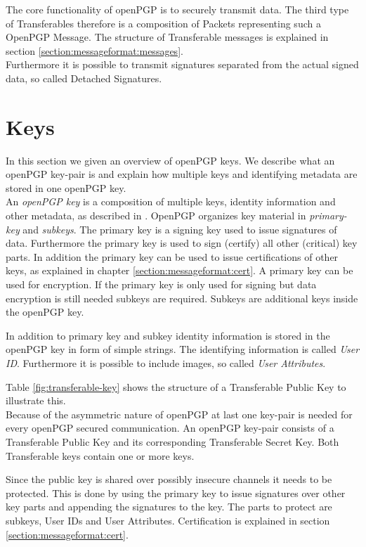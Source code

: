 The core functionality of openPGP is to securely transmit data. The third type of Transferables therefore is a composition of Packets representing such a OpenPGP Message. The structure of Transferable messages is explained in section \ref{section:messageformat:messages}. \\

Furthermore it is possible to transmit signatures separated from the actual signed data, so called Detached Signatures.

\section{Keys}
\label{section:messageformat:keys}

In this section we given an overview of openPGP keys. We describe what an openPGP key-pair is and explain how multiple keys and identifying metadata are stored in one openPGP key. \\

An \textit{openPGP key} is a composition of multiple keys, identity information and other metadata, as described in  \cite[section 11.1]{RFC4880}. OpenPGP organizes key material in \textit{primary-key} and \textit{subkeys}. The primary key is a signing key used to issue signatures of data. Furthermore the primary key is used to sign (certify) all other (critical) key parts. In addition the primary key can be used to issue certifications of other keys, as explained in chapter \ref{section:messageformat:cert}. A primary key can be used for encryption. If the primary key is only used for  signing but data encryption is still needed subkeys are required. Subkeys are additional keys inside the openPGP key. 

In addition to primary key and subkey identity information is stored in the openPGP key in form of simple strings. The identifying information is called \textit{User ID}. Furthermore it is possible to include images, so called \textit{User Attributes}. 

Table \ref{fig:transferable-key} shows the structure of a Transferable Public Key to illustrate this. \\

Because of the  asymmetric nature of openPGP at last one key-pair is needed for every openPGP secured communication. An openPGP key-pair consists of a Transferable Public Key and its corresponding Transferable Secret Key. Both Transferable keys contain one or more keys. 


Since the public key is shared over possibly insecure channels it needs to be protected. This is done by using the primary key to issue signatures over other key parts and appending the signatures to the key. The parts to protect are subkeys, User IDs and User Attributes. Certification is explained in section \ref{section:messageformat:cert}. \\


